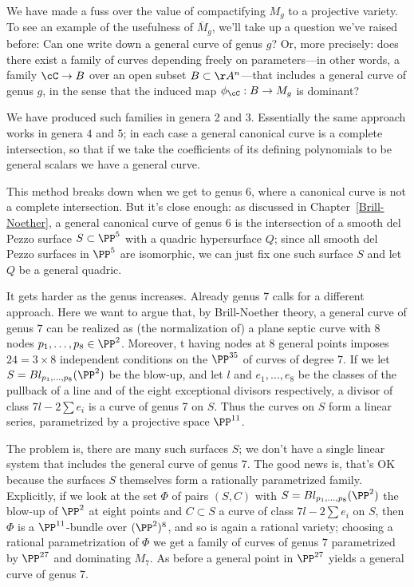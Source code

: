 We have made a fuss over the value of compactifying $M_g$ to a projective variety. To see an example of the usefulness of $\overline M_g$, we'll take up a question we've raised before: Can one write down a general curve of genus $g$?
Or, more precisely: does there exist  a family of curves depending freely on parameters---in other words, a family $\cC \to B$ over an open subset $B \subset \AA^n$---that includes a general curve of genus $g$, in the sense that the induced map $\phi_\cC : B \to M_g$ is dominant? 	

We have produced such  families in genera 2 and 3. Essentially
the same approach works in genera $4$ and $5$; in each case a general canonical curve is a complete intersection, so that if we take the coefficients of its defining polynomials to be general scalars we have a general curve.

This method breaks down when we get to genus 6, where a canonical curve is not a complete intersection. But it's close enough: as discussed in Chapter~\ref{Brill-Noether}, a general canonical curve of genus 6 is the intersection of a smooth del Pezzo surface $S \subset \PP^5$ with a quadric hypersurface $Q$; since all smooth del Pezzo surfaces in $\PP^5$ are isomorphic, we can just fix one such surface $S$ and let $Q$ be a general quadric.

It gets harder as the genus increases. Already genus 7 calls for a different approach. Here we want to argue that, by Brill-Noether theory, a general curve of genus $7$ can be realized as (the normalization of) a plane septic curve with 8 nodes $p_1,\dots,p_8 \in \PP^2$. Moreover, t having nodes at 8 general points imposes $24= 3\times 8$ independent conditions on the $\PP^{35}$ of curves of degree 7. 
If we let $S = Bl_{p_1,\dots,p_8}(\PP^2)$ be the blow-up, and let $l$ and $e_1,\dots,e_8$ be the classes of the pullback of a line and of the eight exceptional divisors respectively, a divisor of class $7l - 2 \sum e_i$ is a curve of genus 7 on $S$. Thus the curves on $S$ form a linear series, parametrized by a projective space $\PP^{11}$.

The problem is, there are many such surfaces $S$; we don't have a single linear system that includes the general curve of genus 7. The good news is, that's OK because the surfaces $S$ themselves form a rationally parametrized family. Explicitly, if we look at the set $\Phi$ of pairs $(S, C)$ with $S = Bl_{p_1,\dots,p_8}(\PP^2)$  the blow-up of $\PP^2$ at eight points and $C \subset S$ a curve of class $7l - 2 \sum e_i$ on $S$, then $\Phi$ is a $\PP^{11}$-bundle over $(\PP^2)^8$, and so is again a rational variety; choosing a rational parametrization of $\Phi$ we get a family of curves of genus $7$ parametrized by $\PP^{27}$ and dominating $M_7$. As before a general point in $\PP^{27}$ yields a general curve of genus 7.

